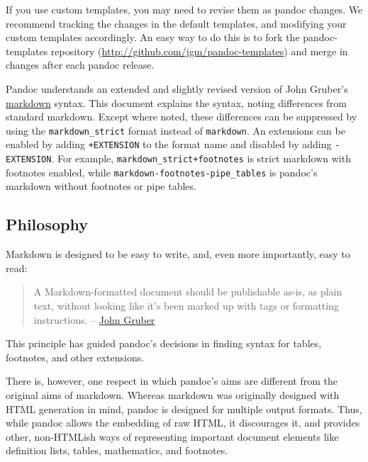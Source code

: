 \documentclass[]{article}
\begin{document}
If you use custom templates, you may need to revise them as pandoc
changes. We recommend tracking the changes in the default templates, and
modifying your custom templates accordingly. An easy way to do this is
to fork the pandoc-templates repository
(\url{http://github.com/jgm/pandoc-templates}) and merge in changes
after each pandoc release.


Pandoc understands an extended and slightly revised version of John
Gruber's \href{http://daringfireball.net/projects/markdown/}{markdown}
syntax. This document explains the syntax, noting differences from
standard markdown. Except where noted, these differences can be
suppressed by using the \texttt{markdown\_strict} format instead of
\texttt{markdown}. An extensions can be enabled by adding
\texttt{+EXTENSION} to the format name and disabled by adding
\texttt{-EXTENSION}. For example, \texttt{markdown\_strict+footnotes} is
strict markdown with footnotes enabled, while
\texttt{markdown-footnotes-pipe\_tables} is pandoc's markdown without
footnotes or pipe tables.

\subsection{Philosophy}

Markdown is designed to be easy to write, and, even more importantly,
easy to read:

\begin{quote}
A Markdown-formatted document should be publishable as-is, as plain
text, without looking like it's been marked up with tags or formatting
instructions. --
\href{http://daringfireball.net/projects/markdown/syntax\#philosophy}{John
Gruber}
\end{quote}

This principle has guided pandoc's decisions in finding syntax for
tables, footnotes, and other extensions.

There is, however, one respect in which pandoc's aims are different from
the original aims of markdown. Whereas markdown was originally designed
with HTML generation in mind, pandoc is designed for multiple output
formats. Thus, while pandoc allows the embedding of raw HTML, it
discourages it, and provides other, non-HTMLish ways of representing
important document elements like definition lists, tables, mathematics,
and footnotes.
\end{document}
